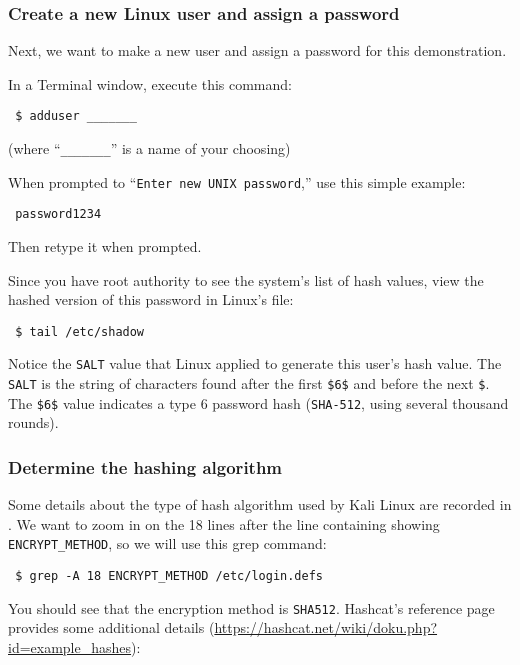 \subsubsection{Create a new Linux user and assign a password}
  Next, we want to make a new user and assign a password for this demonstration.
  \newline

  \noindent
  In a Terminal window, execute this command:
  \begin{verbatim} $ adduser _______ \end{verbatim}

  (where ``\verb|_______|'' is a name of your choosing)
  \bigskip

  \noindent
  When prompted to ``\verb|Enter new UNIX password|,'' use this simple example:
  \begin{verbatim} password1234 \end{verbatim}
  \noindent
  Then retype it when prompted.
  \newline

  \noindent
  Since you have root authority to see the system’s list of hash values, view the hashed version of this password in Linux’s  file:
  \begin{verbatim} $ tail /etc/shadow \end{verbatim}

  \noindent
  Notice the \verb|SALT| value that Linux applied to generate this user's hash value. The \verb|SALT| is the string of characters found after the first \verb|$6$| and before the next \verb|$|. The \verb|$6$| value indicates a type 6 password hash (\verb|SHA-512|, using several thousand rounds).

  \subsubsection{Determine the hashing algorithm}
  Some details about the type of hash algorithm used by Kali Linux are recorded in . We want to zoom in on the 18 lines after the line containing showing \verb|ENCRYPT_METHOD|, so we will use this grep command:

  \begin{verbatim} $ grep -A 18 ENCRYPT_METHOD /etc/login.defs \end{verbatim}

  \noindent
  You should see that the encryption method is \verb|SHA512|. Hashcat’s reference page provides some additional details (\url{https://hashcat.net/wiki/doku.php?id=example_hashes}):


